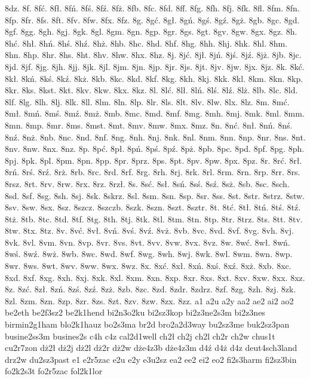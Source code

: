 {8dz.
8f.
8fć.
8fł.
8fń.
8fś.
8fź.
8fż.
8fb.
8fc.
8fd.
8ff.
8fg.
8fh.
8fj.
8fk.
8fl.
8fm.
8fn.
8fp.
8fr.
8fs.
8ft.
8fv.
8fw.
8fx.
8fz.
8g.
8gć.
8gł.
8gń.
8gś.
8gź.
8gż.
8gb.
8gc.
8gd.
8gf.
8gg.
8gh.
8gj.
8gk.
8gl.
8gm.
8gn.
8gp.
8gr.
8gs.
8gt.
8gv.
8gw.
8gx.
8gz.
8h.
8hć.
8hł.
8hń.
8hś.
8hź.
8hż.
8hb.
8hc.
8hd.
8hf.
8hg.
8hh.
8hj.
8hk.
8hl.
8hm.
8hn.
8hp.
8hr.
8hs.
8ht.
8hv.
8hw.
8hx.
8hz.
8j.
8jć.
8jł.
8jń.
8jś.
8jź.
8jż.
8jb.
8jc.
8jd.
8jf.
8jg.
8jh.
8jj.
8jk.
8jl.
8jm.
8jn.
8jp.
8jr.
8js.
8jt.
8jv.
8jw.
8jx.
8jz.
8k.
8kć.
8kł.
8kń.
8kś.
8kź.
8kż.
8kb.
8kc.
8kd.
8kf.
8kg.
8kh.
8kj.
8kk.
8kl.
8km.
8kn.
8kp.
8kr.
8ks.
8kst.
8kt.
8kv.
8kw.
8kx.
8kz.
8l.
8lć.
8lł.
8lń.
8lś.
8lź.
8lż.
8lb.
8lc.
8ld.
8lf.
8lg.
8lh.
8lj.
8lk.
8ll.
8lm.
8ln.
8lp.
8lr.
8ls.
8lt.
8lv.
8lw.
8lx.
8lz.
8m.
8mć.
8mł.
8mń.
8mś.
8mź.
8mż.
8mb.
8mc.
8md.
8mf.
8mg.
8mh.
8mj.
8mk.
8ml.
8mm.
8mn.
8mp.
8mr.
8ms.
8mst.
8mt.
8mv.
8mw.
8mx.
8mz.
8n.
8nć.
8nł.
8nń.
8nś.
8nź.
8nż.
8nb.
8nc.
8nd.
8nf.
8ng.
8nh.
8nj.
8nk.
8nl.
8nm.
8nn.
8np.
8nr.
8ns.
8nt.
8nv.
8nw.
8nx.
8nz.
8p.
8pć.
8pł.
8pń.
8pś.
8pź.
8pż.
8pb.
8pc.
8pd.
8pf.
8pg.
8ph.
8pj.
8pk.
8pl.
8pm.
8pn.
8pp.
8pr.
8prz.
8ps.
8pt.
8pv.
8pw.
8px.
8pz.
8r.
8rć.
8rł.
8rń.
8rś.
8rź.
8rż.
8rb.
8rc.
8rd.
8rf.
8rg.
8rh.
8rj.
8rk.
8rl.
8rm.
8rn.
8rp.
8rr.
8rs.
8rsz.
8rt.
8rv.
8rw.
8rx.
8rz.
8rzł.
8s.
8sć.
8sł.
8sń.
8sś.
8sź.
8sż.
8sb.
8sc.
8sch.
8sd.
8sf.
8sg.
8sh.
8sj.
8sk.
8skrz.
8sl.
8sm.
8sn.
8sp.
8sr.
8ss.
8st.
8str.
8strz.
8stw.
8sv.
8sw.
8sx.
8sz.
8szcz.
8szczb.
8szk.
8szn.
8szt.
8sztr.
8t.
8tć.
8tł.
8tń.
8tś.
8tź.
8tż.
8tb.
8tc.
8td.
8tf.
8tg.
8th.
8tj.
8tk.
8tl.
8tm.
8tn.
8tp.
8tr.
8trz.
8ts.
8tt.
8tv.
8tw.
8tx.
8tz.
8v.
8vć.
8vł.
8vń.
8vś.
8vź.
8vż.
8vb.
8vc.
8vd.
8vf.
8vg.
8vh.
8vj.
8vk.
8vl.
8vm.
8vn.
8vp.
8vr.
8vs.
8vt.
8vv.
8vw.
8vx.
8vz.
8w.
8wć.
8wł.
8wń.
8wś.
8wź.
8wż.
8wb.
8wc.
8wd.
8wf.
8wg.
8wh.
8wj.
8wk.
8wl.
8wm.
8wn.
8wp.
8wr.
8ws.
8wt.
8wv.
8ww.
8wx.
8wz.
8x.
8xć.
8xł.
8xń.
8xś.
8xź.
8xż.
8xb.
8xc.
8xd.
8xf.
8xg.
8xh.
8xj.
8xk.
8xl.
8xm.
8xn.
8xp.
8xr.
8xs.
8xt.
8xv.
8xw.
8xx.
8xz.
8z.
8zć.
8zł.
8zń.
8zś.
8zź.
8zż.
8zb.
8zc.
8zd.
8zdr.
8zdrz.
8zf.
8zg.
8zh.
8zj.
8zk.
8zl.
8zm.
8zn.
8zp.
8zr.
8zs.
8zt.
8zv.
8zw.
8zx.
8zz.
a1
a2u
a2y
aa2
ae2
ai2
ao2
be2eth
be2f3sz2
be2k1hend
bi2n3o2ku
bi2sz3kop
bi2z3ne2s3m
bi2z3nes
birmin2g1ham
blo2k1hauz
bo2s3ma
br2d
bro2a2d3way
bu2sz3me
buk2sz3pan
busine2ss3m
busines2s
c4h
c4z
cal2d1well
ch2ł
ch2j
ch2l
ch2r
ch2w
chus1t
cu2r7zon
dż2ł
dż2j
dż2l
dż2r
dż2w
dże4z3b
dże4z3m
d4ź
d4ż
d4z
deut4sch3land
drz2w
du2sz3past
e1
e2r5zac
e2u
e2y
e3u2sz
ea2
ee2
ei2
eo2
fi2s3harm
fi2sz3bin
fo2k2s3t
fo2r5zac
fol2k1lor
}
